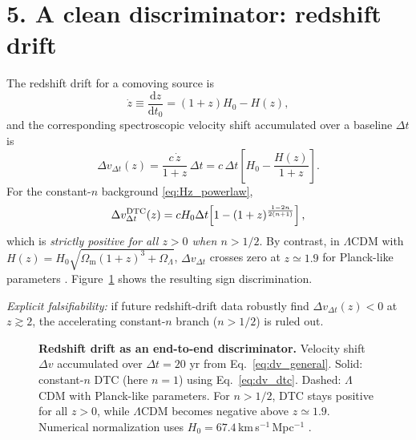 \documentclass[12pt]{article}
\newcommand{\Om}{\Omega_{\mathrm{m}}}
\newcommand{\Ol}{\Omega_{\Lambda}}
\newcommand{\dd}{\mathrm{d}}
\newcommand{\KdriftTwenty}{41.33}
\begin{document}
\section*{5. A clean discriminator: redshift drift}
The redshift drift for a comoving source is \citep{Sandage1962,Loeb1998}
\begin{equation}
\dot z \equiv \frac{\dd z}{\dd t_{0}}=(1+z)H_{0}-H(z),
\label{eq:redshift_drift}
\end{equation}
and the corresponding spectroscopic velocity shift accumulated over a baseline $\Delta t$ is
\begin{equation}
\Delta v_{\Delta t}(z)=\frac{c\,\dot z}{1+z}\,\Delta t
= c\,\Delta t\left[H_{0}-\frac{H(z)}{1+z}\right].
\label{eq:dv_general}
\end{equation}
For the constant-$n$ background \eqref{eq:Hz_powerlaw},
\begin{equation}
\Delta v_{\Delta t}^{\rm DTC}(z)=cH_{0}\Delta t\!\left[1-(1+z)^{\frac{1-2n}{2(n+1)}}\right],
\label{eq:dv_dtc}
\end{equation}
which is \emph{strictly positive for all $z>0$ when $n>1/2$}. By contrast, in $\Lambda$CDM with $H(z)=H_{0}\sqrt{\Om(1+z)^{3}+\Ol}$, $\Delta v_{\Delta t}$ crosses zero at $z\simeq 1.9$ for Planck-like parameters \citep{Planck2018}. Figure~\ref{fig:drift} shows the resulting sign discrimination.

\emph{Explicit falsifiability:} if future redshift-drift data robustly find $\Delta v_{\Delta t}(z)<0$ at $z\gtrsim 2$, the accelerating constant-$n$ branch ($n>1/2$) is ruled out.

\begin{figure}[t]
\centering
{}
\caption{\textbf{Redshift drift as an end-to-end discriminator.}
Velocity shift $\Delta v$ accumulated over $\Delta t=20$ yr from Eq.~\eqref{eq:dv_general}. Solid: constant-$n$ DTC (here $n=1$) using Eq.~\eqref{eq:dv_dtc}. Dashed: $\Lambda$CDM with Planck-like parameters. For $n>1/2$, DTC stays positive for all $z>0$, while $\Lambda$CDM becomes negative above $z\simeq 1.9$. Numerical normalization uses $H_{0}=67.4$\,km\,s$^{-1}$\,Mpc$^{-1}$ \citep{Planck2018}.}
\label{fig:drift}
\end{figure}
\end{document}
